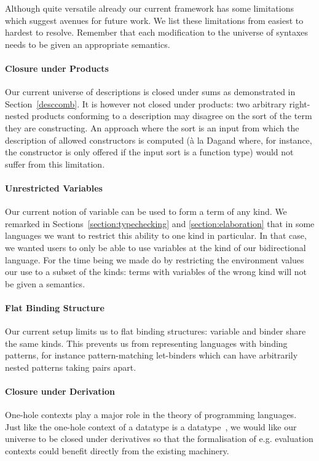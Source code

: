 {Although quite versatile already our current framework has some limitations
which suggest avenues for future work. We list these limitations from easiest
to hardest to resolve. Remember that each modification to the universe of
syntaxes needs to be given an appropriate semantics.

\paragraph{Closure under Products} Our current universe of descriptions is
closed under sums as demonstrated in Section~\ref{desccomb}. It is however
not closed under products: two arbitrary right-nested products conforming
to a description may disagree on the sort of the term they are constructing.
An approach where the sort is an input from which the description of allowed
constructors is computed (à la Dagand \citeyear{DBLP:phd/ethos/Dagand13} where,
for instance, the  constructor is only offered if the input sort is
a function type) would not suffer from this limitation.

\paragraph{Unrestricted Variables} Our current notion of variable can be used
to form a term of any kind. We remarked in Sections~\ref{section:typechecking}
and \ref{section:elaboration} that in some languages we want to restrict this
ability to one kind in particular. In that case, we wanted users to only be able
to use variables at the kind  of our bidirectional language. For the
time being we made do by restricting the environment values our 
use to a subset of the kinds: terms with variables of the wrong kind will not be
given a semantics.

\paragraph{Flat Binding Structure} Our current setup limits us to flat binding
structures: variable and binder share the same kinds. This prevents us from
representing languages with binding patterns, for instance pattern-matching
let-binders which can have arbitrarily nested patterns taking pairs apart.

\paragraph{Closure under Derivation} One-hole contexts play a major role in the
theory of programming languages. Just like the one-hole context of a datatype is
a datatype~\cite{DBLP:journals/fuin/AbbottAMG05}, we would like our universe to
be closed under derivatives so that the formalisation of e.g. evaluation contexts
could benefit directly from the existing machinery.

}
